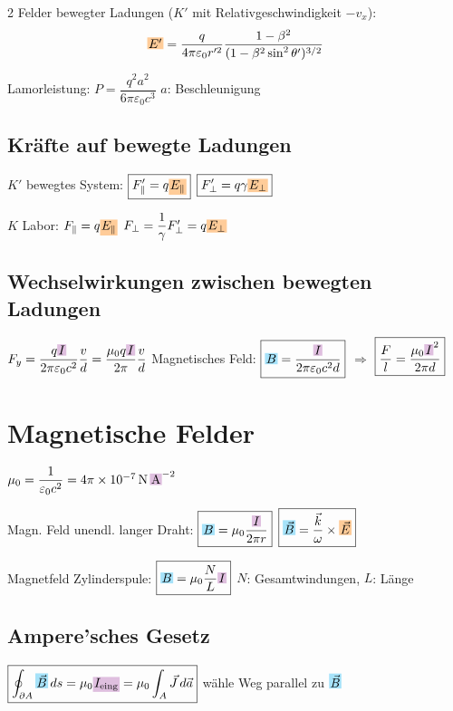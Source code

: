 \documentclass[10pt,a4paper]{article}
\newcommand{\chbox}[1]{%
  \par\vspace{2pt}\noindent%
  \colorbox{magenta!25}{\parbox{\dimexpr\linewidth-2\fboxsep\relax}{#1}}%
  \par\vspace{2pt}}
\newcommand{\icc}[1]{{\setlength\fboxsep{1pt}\colorbox{violet!25}{\ensuremath{#1}}}}
\newcommand{\efc}[1]{{\setlength\fboxsep{1pt}\colorbox{orange!40}{\ensuremath{#1}}}}
\newcommand{\bfc}[1]{{\setlength\fboxsep{1pt}\colorbox{cyan!35}{\ensuremath{#1}}}}
\begin{document}
\begin{multicols}{2}
Felder bewegter Ladungen ($K'$ mit Relativgeschwindigkeit $-v_x$):
\[
  \efc{E'}=\dfrac{q}{4\pi\varepsilon_0 r'^2}\dfrac{1-\beta^2}{(1-\beta^2\sin^2\theta')^{3/2}}
\]

Lamorleistung: $P=\dfrac{q^2 a^2}{6\pi\varepsilon_0 c^3}$ \quad $a$: Beschleunigung

\subsection{Kräfte auf bewegte Ladungen}

$K'$ bewegtes System: $\boxed{F'_\parallel=q\efc{E_\parallel}}$ \quad $\boxed{F'_\perp=q\gamma \efc{E_\perp}}$

$K$ Labor: $F_\parallel=q\efc{E_\parallel}$ \quad $F_\perp=\dfrac{1}{\gamma}F'_\perp=q\efc{E_\perp}$

\subsection{Wechselwirkungen zwischen bewegten Ladungen}

$F_y=\dfrac{q\icc{I}}{2\pi\varepsilon_0 c^2}\dfrac{v}{d}=\dfrac{\mu_0 q\icc{I}}{2\pi}\dfrac{v}{d}$ \quad Magnetisches Feld: $\boxed{\bfc{B}=\dfrac{\icc{I}}{2\pi\varepsilon_0 c^2 d}}$ $\Rightarrow$ $\boxed{\dfrac{F}{l}=\dfrac{\mu_0 \icc{I}^2}{2\pi d}}$

\section{Magnetische Felder}

\chbox{$\mu_0=\dfrac{1}{\varepsilon_0 c^2}=4\pi\times10^{-7}\,\text{N}\,\icc{\text{A}}^{-2}$}

Magn. Feld unendl. langer Draht: $\boxed{\bfc{B}=\mu_0\dfrac{\icc{I}}{2\pi r}}$ \quad $\boxed{\bfc{\vec{B}}=\dfrac{\vec{k}}{\omega}\times\efc{\vec{E}}}$

Magnetfeld Zylinderspule: $\boxed{\bfc{B}=\mu_0\dfrac{N}{L}\icc{I}}$ \quad $N$: Gesamtwindungen, $L$: Länge

\subsection{Ampere'sches Gesetz}

$\boxed{\oint_{\partial A}\bfc{\vec{B}}\,ds=\mu_0 \icc{I_{\text{eing}}}=\mu_0\int_A\vec{J}\,d\vec{a}}$ \quad wähle Weg parallel zu $\bfc{\vec{B}}$


\end{multicols}
\end{document}
